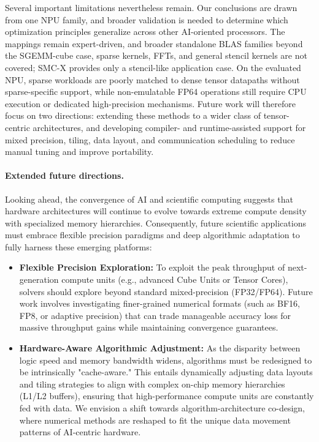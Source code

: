 \documentclass{article}
\newcommand{\rev}[1]{#1}
\begin{document}
Several important limitations nevertheless remain. Our conclusions are drawn from one NPU family, and broader validation is needed to determine which optimization principles generalize across other AI-oriented processors. \rev{The mappings remain expert-driven, and broader standalone BLAS families beyond the SGEMM-cube case, sparse kernels, FFTs, and general stencil kernels are not covered; SMC-X provides only a stencil-like application case. On the evaluated NPU, sparse workloads are poorly matched to dense tensor datapaths without sparse-specific support, while non-emulatable FP64 operations still require CPU execution or dedicated high-precision mechanisms.} Future work will therefore focus on two directions: extending these methods to a wider class of tensor-centric architectures, and developing compiler- and runtime-assisted support for mixed precision, tiling, data layout, and communication scheduling to reduce manual tuning and improve portability.

\paragraph{Extended future directions.}
Looking ahead, the convergence of AI and scientific computing suggests that hardware architectures will continue to evolve towards extreme compute density with specialized memory hierarchies. Consequently, future scientific applications must embrace flexible precision paradigms and deep algorithmic adaptation to fully harness these emerging platforms:

\begin{itemize}
    \item \textbf{Flexible Precision Exploration:} To exploit the peak throughput of next-generation compute units (e.g., advanced Cube Units or Tensor Cores), solvers should explore beyond standard mixed-precision (FP32/FP64). Future work involves investigating finer-grained numerical formats (such as BF16, FP8, or adaptive precision) that can trade manageable accuracy loss for massive throughput gains while maintaining convergence guarantees.
    
    \item \textbf{Hardware-Aware Algorithmic Adjustment:} As the disparity between logic speed and memory bandwidth widens, algorithms must be redesigned to be intrinsically "cache-aware." This entails dynamically adjusting data layouts and tiling strategies to align with complex on-chip memory hierarchies (L1/L2 buffers), ensuring that high-performance compute units are constantly fed with data. We envision a shift towards algorithm-architecture co-design, where numerical methods are reshaped to fit the unique data movement patterns of AI-centric hardware.
\end{itemize}
\end{document}
